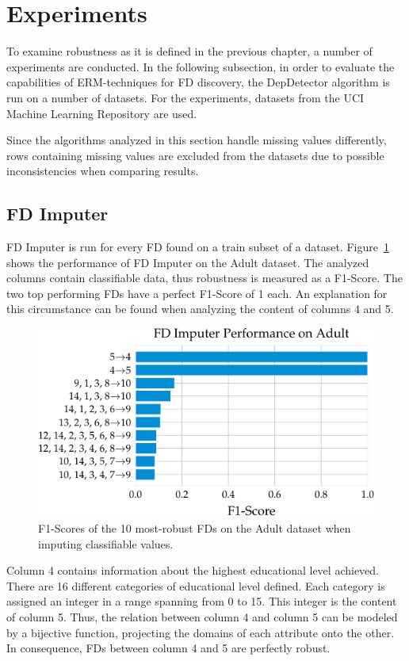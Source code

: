 \newpage
\section{Experiments}
To examine robustness as it is defined in the previous chapter, a number of experiments are conducted.
In the following subsection, in order to evaluate the capabilities of ERM-techniques for FD discovery, the DepDetector algorithm is run on a number of datasets.
For the experiments, datasets from the UCI Machine Learning Repository are used.~\cite{DUA19}

Since the algorithms analyzed in this section handle missing values differently, rows containing missing values are excluded from the datasets due to possible inconsistencies when comparing results.

\subsection{FD Imputer}
FD Imputer is run for every FD found on a train subset of a dataset.
Figure~\ref{fig:f1_fd_adult} shows the performance of FD Imputer on the Adult dataset.
The analyzed columns contain classifiable data, thus robustness is measured as a F1-Score.
The two top performing FDs have a perfect F1-Score of 1 each.
An explanation for this circumstance can be found when analyzing the content of columns 4 and 5.

\begin{figure}[ht]
     \centering
     \includegraphics[width=.8\textwidth]{../figures/adult/f1_fd_imputer_adult.pdf}
     \caption{F1-Scores of the 10 most-robust FDs on the Adult dataset when imputing classifiable values.}
     \label{fig:f1_fd_adult}
\end{figure}

Column 4 contains information about the highest educational level achieved.
There are 16 different categories of educational level defined.
Each category is assigned an integer in a range spanning from 0 to 15.
This integer is the content of column 5.
Thus, the relation between column 4 and column 5 can be modeled by a bijective function, projecting the domains of each attribute onto the other.
In consequence, FDs between column 4 and 5 are perfectly robust.

